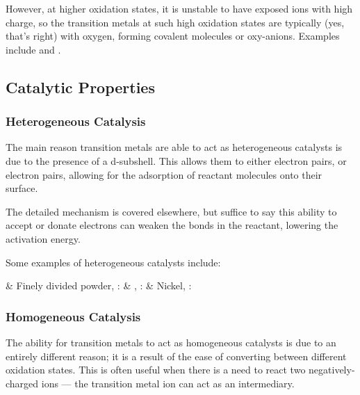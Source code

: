 				However, at higher oxidation states, it is unstable to have exposed ions with high charge, so the transition metals at such
				high oxidation states are typically  (yes, that's right) with oxygen, forming covalent molecules or
				oxy-anions. Examples include  and .




		\subsection{Catalytic Properties}

			\subsubsection{Heterogeneous Catalysis}

				The main reason transition metals are able to act as heterogeneous catalysts is due to the presence of a 
				d-subshell. This allows them to either  electron pairs, or  electron pairs, allowing for the adsorption
				of reactant molecules onto their surface.

				The detailed mechanism is covered elsewhere, but suffice to say this ability to accept or donate electrons can weaken the bonds
				in the reactant, lowering the activation energy.

				Some examples of heterogeneous catalysts include:

				\begin{bulletlist}
					& Finely divided  powder, :	\tabto{70mm}
					& , :						\tabto{70mm}
					& Nickel, :					\tabto{70mm}
				\end{bulletlist}




			\subsubsection{Homogeneous Catalysis}

				The ability for transition metals to act as homogeneous catalysts is due to an entirely different reason; it is a result
				of the ease of converting between different oxidation states. This is often useful when there is a need to react
				two negatively-charged ions --- the transition metal ion can act as an intermediary.

